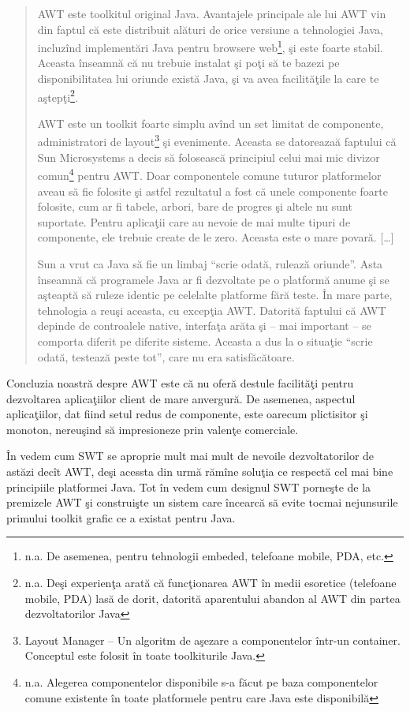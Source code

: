 \begin{quotation}
AWT este toolkitul original Java. Avantajele principale ale lui AWT vin din
faptul că este distribuit alături de orice versiune a tehnologiei Java,
incluzînd implementări Java pentru browsere web\footnote{n.a. De asemenea,
pentru tehnologii embeded, telefoane mobile, PDA, etc.}, şi este foarte stabil.
Aceasta înseamnă că nu trebuie instalat şi poţi să te bazezi pe disponibilitatea
lui oriunde există Java, şi va avea facilităţile la care te
aştepţi\footnote{n.a. Deşi experienţa arată că funcţionarea AWT în medii
esoretice (telefoane mobile, PDA) lasă de dorit, datorită aparentului abandon al
AWT din partea dezvoltatorilor Java}.

AWT este un toolkit foarte simplu avînd un set limitat de componente,
administratori de layout\footnote{Layout Manager -- Un algoritm de aşezare a
componentelor într-un container. Conceptul este folosit în toate toolkiturile
Java.} şi evenimente. Aceasta se datoreazaă faptului că Sun Microsystems a decis
să folosească principiul celui mai mic divizor comun\footnote{n.a. Alegerea
componentelor disponibile s-a făcut pe baza componentelor comune existente în
toate platformele pentru care Java este disponibilă} pentru AWT. Doar
componentele comune tuturor platformelor aveau să fie folosite şi astfel
rezultatul a fost că unele componente foarte folosite, cum ar fi tabele, arbori,
bare de progres şi altele nu sunt suportate. Pentru aplicaţii care au nevoie de
mai multe tipuri de componente, ele trebuie create de le zero. Aceasta este o
mare povară. [\ldots]

Sun a vrut ca Java să fie un limbaj ``scrie odată, rulează oriunde''. Asta
înseamnă că programele Java ar fi dezvoltate pe o platformă anume şi se aşteaptă
să ruleze identic pe celelalte platforme fără teste. În mare parte, tehnologia a
reuşi aceasta, cu excepţia AWT. Datorită faptului că AWT depinde de controalele
native, interfaţa arăta şi -- mai important -- se comporta diferit pe diferite
sisteme. Aceasta a dus la o situaţie ``scrie odată, testează peste tot'', care
nu era satisfăcătoare.
\cite{swtawtswing}
\end{quotation}

Concluzia noastră despre AWT este că nu oferă destule facilităţi pentru
dezvoltarea aplicaţiilor client de mare anvergură. De asemenea, aspectul
aplicaţiilor, dat fiind setul redus de componente, este oarecum plictisitor şi
monoton, nereuşind să impresioneze prin valenţe comerciale.

În \cite{awtswing} vedem cum SWT se aproprie mult mai mult de nevoile
dezvoltatorilor de astăzi decît AWT, deşi acessta din urmă rămîne soluţia ce
respectă cel mai bine principiile platformei Java. Tot în \cite{awtswing} vedem
cum designul SWT porneşte de la premizele AWT şi construişte un sistem care
încearcă să evite tocmai nejunsurile primului toolkit grafic ce a existat pentru
Java.

